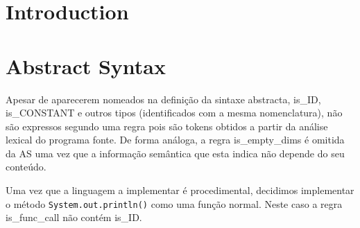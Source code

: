 \documentclass[a4paper]{article}
\title{\documentTitle}
\author{\documentAuthors{}}
\begin{document}
\renewcommand{\figurename}{Figure}
\maketitle
\cleardoublepage

\tableofcontents
\cleardoublepage

\setlength{\parindent}{1cm}
\setlength{\parskip}{0.3cm}

\section{Introduction}
\section{Abstract Syntax}
\indent \indent Apesar de aparecerem nomeados na definição da sintaxe abstracta, 
is\_ID, is\_CONSTANT e outros tipos (identificados com a mesma nomenclatura),
não são expressos segundo uma regra pois são tokens obtidos a partir da análise lexical do programa fonte.
De forma análoga, a regra is\_empty\_dims é omitida da AS uma vez que a informação semântica que esta indica não depende do seu conteúdo.

Uma vez que a linguagem a implementar é procedimental, decidimos implementar o método \texttt{System.out.println()} como uma função normal.
Neste caso a regra is\_func\_call não contém is\_ID. 
\end{document}
